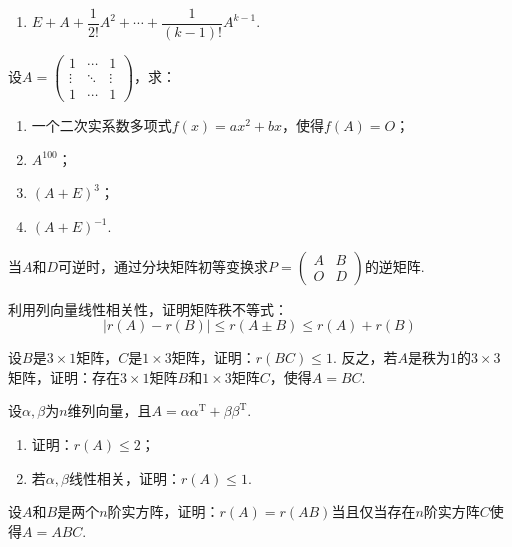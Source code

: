 \begin{exercise}
\begin{exgroup}
\begin{enumerate}
            \item $E+A+\dfrac{1}{2!}A^2+\cdots+\dfrac{1}{(k-1)!}A^{k-1}$.
        \end{enumerate}

        \item 设$A=\begin{pmatrix}
                1      & \cdots & 1      \\
                \vdots & \ddots & \vdots \\
                1      & \cdots & 1
            \end{pmatrix}$，求：
        \begin{enumerate}
            \item 一个二次实系数多项式$f(x)=ax^2+bx$，使得$f(A)=O$；
            \item $A^100$；
            \item $(A+E)^3$；
            \item $(A+E)^{-1}$.
        \end{enumerate}

        \item 当$A$和$D$可逆时，通过分块矩阵初等变换求$P=\begin{pmatrix}A & B \\ O & D\end{pmatrix}$的逆矩阵.

        \item 利用列向量线性相关性，证明矩阵秩不等式：\[|r(A)-r(B)|\leqslant r(A\pm B) \leqslant r(A)+r(B)\]

        \item 设$B$是$3 \times 1$矩阵，$C$是$1 \times 3$矩阵，证明：$r(BC) \leqslant 1$. 反之，若$A$是秩为1的$3 \times 3$矩阵，证明：存在$3 \times 1$矩阵$B$和$1 \times 3$矩阵$C$，使得$A = BC$.

        \item 设$\alpha,\beta$为$n$维列向量，且$A=\alpha\alpha^\mathrm{T}+\beta\beta^\mathrm{T}$.
        \begin{enumerate}
            \item 证明：$r(A) \leqslant 2$；

            \item 若$\alpha,\beta$线性相关，证明：$r(A) \leqslant 1$.
        \end{enumerate}

        \item 设$A$和$B$是两个$n$阶实方阵，证明：$r(A)=r(AB)$当且仅当存在$n$阶实方阵$C$使得$A=ABC$. %


\end{exgroup}
\end{exercise}
